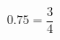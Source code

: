 \documentclass[12pt]{article}
\begin{document}
  \begin{equation}
    0.75 = \frac{3}{4}
  \end{equation}
\end{document}
